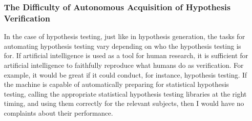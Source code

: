 





\subsubsection{The Difficulty of Autonomous Acquisition of Hypothesis Verification}
In the case of hypothesis testing, just like in hypothesis generation, the tasks for automating hypothesis testing vary depending on who the hypothesis testing is for. If artificial intelligence is used as a tool for human research, it is sufficient for artificial intelligence to faithfully reproduce what humans do as verification. For example, it would be great if it could conduct, for instance, hypothesis testing. If the machine is capable of automatically preparing for statistical hypothesis testing, calling the appropriate statistical hypothesis testing libraries at the right timing, and using them correctly for the relevant subjects, then I would have no complaints about their performance.

